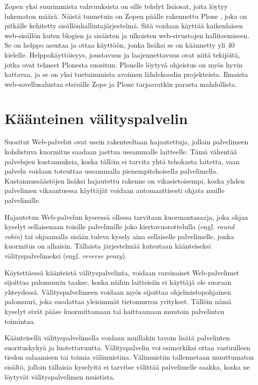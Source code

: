 Zopen yksi suurimmista vahvuuksista on sille tehdyt lisäosat, joita löytyy lukematon määrä. Näistä tunnetuin on Zopen päälle rakennettu Plone \cite{Plone}, joka on pitkälle kehitetty 
sisällönhallintajärjestelmä. Sitä voidaan käyttää kaikenlaisen web-sisällön kuten blogien ja sisäisten ja ulkoisten web-sivustojen hallitsemiseen. Se on helppo asentaa ja ottaa käyttöön, 
jonka lisäksi se on käännetty yli 40 kielelle. Helppokäyttöisyys, joustavuus ja laajennettavuus ovat niitä tekijöitä, jotka ovat tehneet Plonesta suositun. Plonelle löytyvä ohjeistus
on myös hyvin kattavaa, ja se on yksi tuetuimmista avoimen lähdekoodin projekteista. Ilmaista web-sovellusalustaa etsivälle Zope ja Plone tarjoavatkin parasta mahdollista.

\section{Käänteinen välityspalvelin}

Suositut Web-palvelut ovat usein rakenteeltaan hajautettuja, jolloin
palvelimeen kohdistuva kuormitus saadaan jaettua useammalle
laitteelle. Tämä vähentää palvelujen kustannuksia, koska tällöin ei
tarvita yhtä tehokasta laitetta, vaan palvelu voidaan toteuttaa
useammalla pienempitehoisella palvelimella. Kustannussäästöjen lisäksi
hajautettu rakenne on vikasietoisempi, koska yhden palvelimen
vikaantuessa käyttäjät voidaan automaattisesti ohjata muille
palvelimille.

Hajautetun Web-palvelun kyseessä ollessa tarvitaan kuormantasaaja,
joka ohjaa kyselyt sellaisenaan toisille palvelimille joko
kiertovuorottelulla (engl. \textit{round robin}) tai ohjaamalla sisään
tuleva kysely aina sellaiselle palvelimelle, jonka kuormitus on
alhaisin. Tällaista järjestelmää kutsutaan käänteiseksi
välityspalvelimeksi (engl. \textit{reverse proxy}).

Käytettäessä käänteistä välityspalvelinta, voidaan varsinaiset
Web-palvelimet sijoittaa palomuurin taakse, koska näihin laitteisiin
ei käyttäjä ole suoraan yhteydessä. Välityspalvelimeen voidaan myös
sijoittaa ohjelmistopohjainen palomuuri, joka suodattaa yleisimmät
tietomurron yritykset. Tällöin nämä kyselyt eivät pääse
kuormittamaan tai haittaamaan muutoin palvelinten toimintaa.

Käänteisellä välityspalvelimella voidaan muillakin tavoin lisätä
palvelinten suorituskykyä ja luotettavuutta. Välityspalvelin voi
esimerkiksi ottaa vastuulleen tiedon salaamisen tai toimia
välimuistina. Välimuistiin tallennetaan muuttumaton sisältö, jolloin
tällaisia kyselyitä ei tarvitse välittää palvelimelle saakka, koska ne
löytyvät välityspalvelimen muistista.

